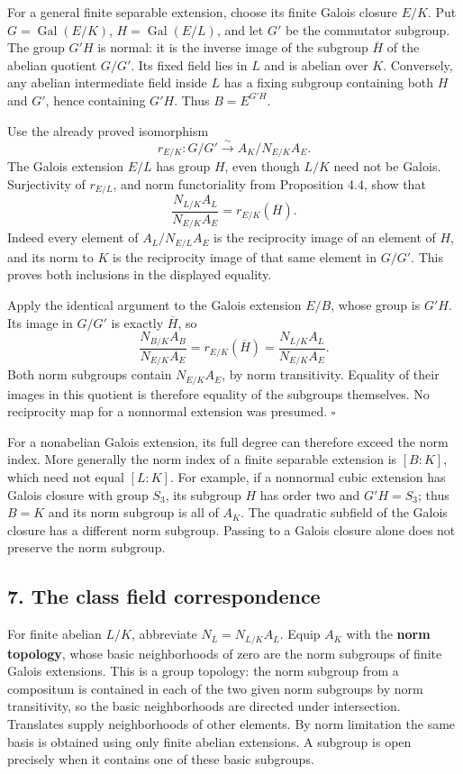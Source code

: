 \documentclass[11pt,a4paper]{article}
\begin{document}
For a general finite separable extension, choose its finite Galois
closure \(E/K\). Put \(G=\operatorname{Gal}(E/K)\),
\(H=\operatorname{Gal}(E/L)\), and let \(G'\) be the commutator
subgroup. The group \(G'H\) is normal: it is the inverse image of the
subgroup \(\overline H\) of the abelian quotient \(G/G'\). Its fixed
field lies in \(L\) and is abelian over \(K\). Conversely, any abelian
intermediate field inside \(L\) has a fixing subgroup containing both
\(H\) and \(G'\), hence containing \(G'H\). Thus \(B=E^{G'H}\).

Use the already proved isomorphism \[
r_{E/K}:G/G'\xrightarrow{\sim}
A_K/N_{E/K}A_E.
\] The Galois extension \(E/L\) has group \(H\), even though \(L/K\)
need not be Galois. Surjectivity of \(r_{E/L}\), and norm functoriality
from Proposition 4.4, show that \[
\frac{N_{L/K}A_L}{N_{E/K}A_E}
=r_{E/K}(\overline H).
\] Indeed every element of \(A_L/N_{E/L}A_E\) is the reciprocity image
of an element of \(H\), and its norm to \(K\) is the reciprocity image
of that same element in \(G/G'\). This proves both inclusions in the
displayed equality.

Apply the identical argument to the Galois extension \(E/B\), whose
group is \(G'H\). Its image in \(G/G'\) is exactly \(\overline H\), so
\[
\frac{N_{B/K}A_B}{N_{E/K}A_E}
=r_{E/K}(\overline H)
=\frac{N_{L/K}A_L}{N_{E/K}A_E}.
\] Both norm subgroups contain \(N_{E/K}A_E\), by norm transitivity.
Equality of their images in this quotient is therefore equality of the
subgroups themselves. No reciprocity map for a nonnormal extension was
presumed. \(\square\)

For a nonabelian Galois extension, its full degree can therefore exceed
the norm index. More generally the norm index of a finite separable
extension is \([B:K]\), which need not equal \([L:K]\). For example, if
a nonnormal cubic extension has Galois closure with group \(S_3\), its
subgroup \(H\) has order two and \(G'H=S_3\); thus \(B=K\) and its norm
subgroup is all of \(A_K\). The quadratic subfield of the Galois closure
has a different norm subgroup. Passing to a Galois closure alone does
not preserve the norm subgroup.

\subsection{7. The class field
correspondence}\label{the-class-field-correspondence}

For finite abelian \(L/K\), abbreviate \(N_L=N_{L/K}A_L\). Equip \(A_K\)
with the \textbf{norm topology}, whose basic neighborhoods of zero are
the norm subgroups of finite Galois extensions. This is a group
topology: the norm subgroup from a compositum is contained in each of
the two given norm subgroups by norm transitivity, so the basic
neighborhoods are directed under intersection. Translates supply
neighborhoods of other elements. By norm limitation the same basis is
obtained using only finite abelian extensions. A subgroup is open
precisely when it contains one of these basic subgroups.
\end{document}

